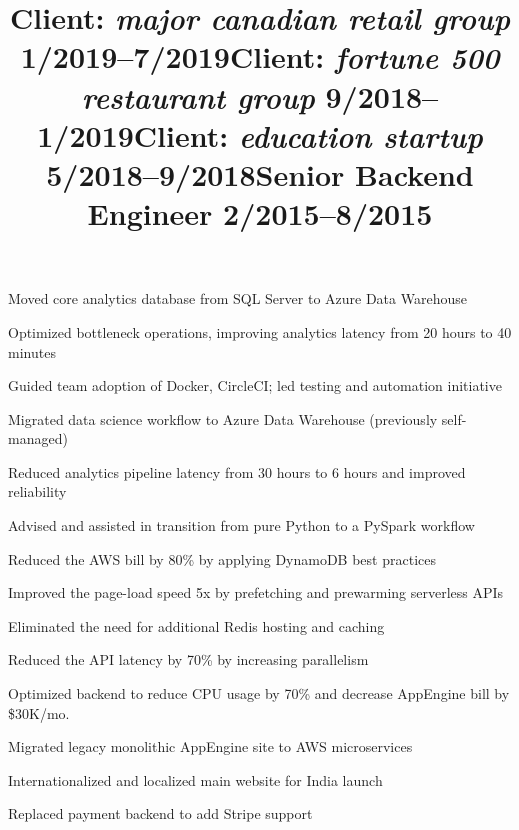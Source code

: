 \documentclass[line]{res}
\renewcommand{\sl}{\itshape\bfseries} %
\begin{document}
\begin{resume}
\employer{}
\vspace{-2em} %
\title{Client: \textit{major canadian retail group}  \hfill 1/2019--7/2019}
\begin{position}
\begin{sublist}
\item Moved core analytics database from SQL Server to Azure Data Warehouse
\item Optimized bottleneck operations, improving analytics latency from 20 hours to 40 minutes
\item Guided team adoption of Docker, CircleCI; led testing and automation initiative
\end{sublist}
\end{position}

\employer{}
\vspace{-2em} %
\title{Client: \textit{fortune 500 restaurant group}  \hfill 9/2018--1/2019}
\begin{position}
\begin{sublist}
\item Migrated data science workflow to Azure Data Warehouse (previously self-managed)
\item Reduced analytics pipeline latency from 30 hours to 6 hours and improved reliability
\item Advised and assisted in transition from pure Python to a PySpark workflow 
\end{sublist}
\end{position}

\employer{}
\vspace{-2em} %
\title{Client: \textit{education startup}  \hfill 5/2018--9/2018}
\begin{position}
\begin{sublist}
\item Reduced the AWS bill by 80\% by applying DynamoDB best practices
\item Improved the page-load speed 5x by prefetching and prewarming serverless APIs
\item Eliminated the need for additional Redis hosting and caching
\item Reduced the API latency by 70\% by increasing parallelism
\end{sublist}
\end{position}


\employer{{\sl Udacity}
}
\title{Senior Backend Engineer \hfill 2/2015--8/2015}
\begin{position}
\begin{sublist}
\item Optimized backend to reduce CPU usage by 70\% and decrease AppEngine bill by \$30K/mo.
\item Migrated legacy monolithic AppEngine site to AWS microservices
\item Internationalized and localized main website for India launch
\item Replaced payment backend to add Stripe support
\end{sublist}
\end{position}



\end{resume}
\end{document}
